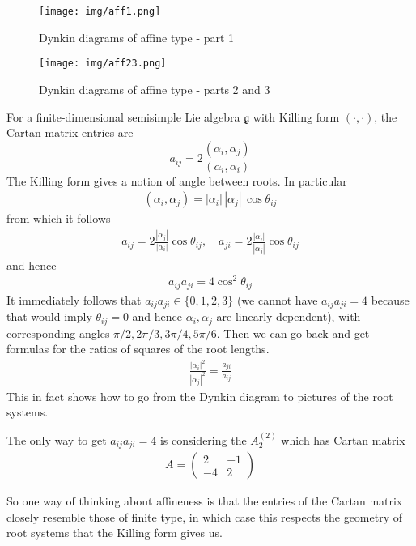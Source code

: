 \documentclass[12pt]{article}
\begin{document}
\begin{figure}[H]
    \centering
    \texttt{[image: img/aff1.png]}
    \caption{Dynkin diagrams of affine type - part 1}
\end{figure}

\begin{figure}[H]
    \centering \texttt{[image: img/aff23.png]}
    \caption{Dynkin diagrams of affine type - parts 2 and 3}
\end{figure}

\begin{remark}
     For a finite-dimensional semisimple Lie algebra $\mathfrak{g}$ with Killing form $(\cdot,\cdot)$, the Cartan matrix entries are
    \[a_{ij} = 2\frac{(\alpha_i,\alpha_j)}{(\alpha_i,\alpha_i)}\]
    The Killing form gives a notion of angle between roots. In particular \begin{align*}
        (\alpha_i,\alpha_j) = |\alpha_i|\,|\alpha_j|\,\cos\theta_{ij}
    \end{align*} from which it follows \begin{align*}
        a_{ij} = 2 \frac{|\alpha_j|}{|\alpha_i|} \cos\theta_{ij}, \quad
        a_{ji} = 2 \frac{|\alpha_i|}{|\alpha_j|} \cos\theta_{ij}
    \end{align*} and hence \begin{align*}
        a_{ij}a_{ji} = 4\cos^2\theta_{ij}
    \end{align*} It immediately follows that $a_{ij}a_{ji} \in \{0,1,2,3\}$ (we cannot have $a_{ij}a_{ji} = 4$ because that would imply $\theta_{ij} = 0$ and hence $\alpha_i, \alpha_j$ are linearly dependent), with corresponding angles $\pi/2, 2\pi/3, 3\pi/4, 5\pi/6$. Then we can go back and get formulas for the ratios of squares of the root lengths.
    \begin{align*}
        \frac{|\alpha_i|^2}{|\alpha_j|^2} = \frac{a_{ji}}{a_{ij}}
    \end{align*}
    This in fact shows how to go from the Dynkin diagram to pictures of the root systems.

    The only way to get $a_{ij}a_{ji} = 4$ is considering the $A^{(2)}_2$ which has Cartan matrix \begin{align*}
        A = \begin{pmatrix}
                2  & -1 \\
                -4 & 2
            \end{pmatrix}
    \end{align*} 

    So one way of thinking about affineness is that the entries of the Cartan matrix closely resemble those of finite type, in which case this respects the geometry of root systems that the Killing form gives us.
\end{remark}
\end{document}
